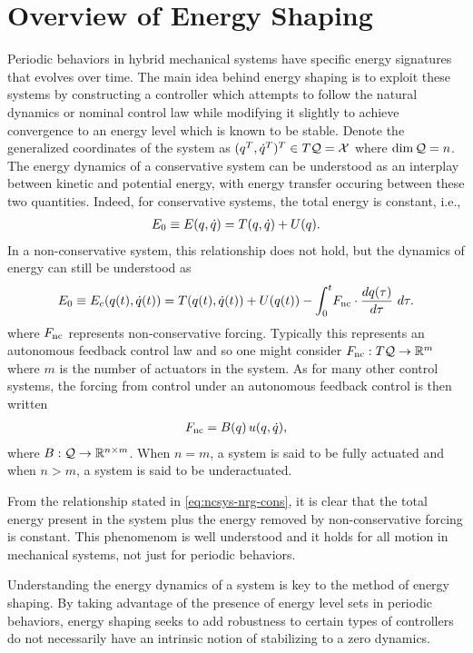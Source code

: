 \section*{Overview of Energy Shaping}
Periodic behaviors in hybrid mechanical systems have specific energy signatures that evolves over time.
%
The main idea behind energy shaping is to exploit these systems by constructing a controller which attempts to follow the natural dynamics or nominal control law while modifying it slightly to achieve convergence to an energy level which is known to be stable.
%
Denote the generalized coordinates of the system as $(q^{T}, \dot{q}^{T})^{T} \in T\mathcal{Q} = \mathcal{X}$ where $\dim \mathcal{Q} = n$.
The energy dynamics of a conservative system can be understood as an interplay between kinetic and potential energy, with energy transfer occuring between these two quantities.
%
Indeed, for conservative systems, the total energy is constant, i.e.,
\begin{align}
  \label{eq:consys-nrg}
  E_{0} \equiv E(q, \dot{q}) = T(q, \dot{q}) + U(q).
\end{align}
%
In a non-conservative system, this relationship does not hold, but the dynamics of energy can still be understood as
\begin{align}
  \label{eq:ncsys-nrg-cons}
  E_{0} \equiv E_{c}(q(t), \dot{q}(t)) = T(q(t), \dot{q}(t)) + U(q(t)) - \int_{0}^{t} \! F_{\mathrm{nc}} \cdot \frac{dq(\tau)}{d\tau} \ d\tau.
\end{align}
where $F_{\mathrm{nc}}$ represents non-conservative forcing.
%
Typically this represents an autonomous feedback control law and so one might consider $F_{\mathrm{nc}} : T\mathcal{Q} \to \mathbb{R}^{m}$ where $m$ is the number of actuators in the system.
%
As for many other control systems, the forcing from control under an autonomous feedback control is then written
\begin{align}
  F_{\mathrm{nc}} = B(q) \, u(q, \dot{q}),
\end{align}
where $B : \mathcal{Q} \to \mathbb{R}^{n \times m}$.
%
When $n = m$, a system is said to be fully actuated and when $n > m$, a system is said to be underactuated.

From the relationship stated in \eqref{eq:ncsys-nrg-cons}, it is clear that the total energy present in the system plus the energy removed by non-conservative forcing is constant.
%
This phenomenom is well understood and it holds for all motion in mechanical systems, not just for periodic behaviors.

Understanding the energy dynamics of a system is key to the method of energy shaping.
%
By taking advantage of the presence of energy level sets in periodic behaviors, energy shaping seeks to add robustness to certain types of controllers do not necessarily have an intrinsic notion of stabilizing to a zero dynamics.
%


